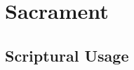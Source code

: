 \section{Sacrament}
	\label{SACRAMENT}
	





\subsection{Scriptural Usage} %
	\label{SACRAMENT-SCRIPTURES}

	
	
